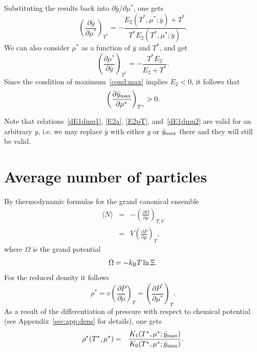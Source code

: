 \documentclass[12pt]{article}
\numberwithin{equation}{section}
\begin{document}
	Substituting the results back into $\partial \bar{y}/\partial \mu^*$, one gets
	\begin{equation}
		\left(\frac{\partial \bar{y}}{\partial \mu^*} \right)_{T^*} = -\frac{E_2(T^*,\mu^*;\bar{y}) + T^*}{T^* E_2(T^*,\mu^*;\bar{y})}.
	\end{equation}
	We can also consider $\mu^*$ as a function of $\bar{y}$ and $T^*$, and get
	\begin{equation}
		\left(\frac{\partial \mu^*}{\partial \bar{y}} \right)_{T^*} = -\frac{T^* E_2}{E_2 + T^*}.
	\end{equation}
	Since the condition of maximum~\eqref{cond:max} implies $E_2 < 0$, it follows that
	\begin{equation}
		\left(\frac{\partial \bar{y}_{\rm max}}{\partial \mu^*} \right)_{T^*} > 0.
	\end{equation}
	
	Note that relations~\eqref{dE1dmu1}, \eqref{E2a}, \eqref{E2pT}, and~\eqref{dE1dmu2} are valid for an arbitrary $y$, i.e. we may replace $\bar{y}$ with either $y$ or $\bar{y}_{\rm max}$ there and they will still be valid.
	
	
	\pagebreak
	\section{Average number of particles}
	By thermodynamic formulas for the grand canonical ensemble
	\begin{eqnarray}
		\langle N \rangle & = & -\left(\frac{\partial \Omega}{\partial \mu}\right)_{T,V}
		\nonumber\\
		& = & V \left(\frac{\partial P}{\partial \mu}\right)_T,
	\end{eqnarray}
	where $\Omega$ is the grand potential
	\begin{equation}
		\Omega = -k_{\rm B} T \ln \Xi.
	\end{equation}
	For the reduced density it follows
	\begin{equation}
		\label{eq:dens}
		\rho^* = v\left(\frac{\partial P}{\partial \mu}\right)_T = \left(\frac{\partial P^*}{\partial \mu^*}\right)_T.
	\end{equation}
	As a result of the differentiation of pressure with respect to chemical potential (see Appendix~\ref{sec:app:dens} for details), one gets
	\begin{eqnarray}
		\label{eq:densK}
		\rho^*(T^*,\mu^*) & = & \frac{K_1(T^*,\mu^*;\bar{y}_{\rm max})}{K_0(T^*,\mu^*;\bar{y}_{\rm max})}.
	\end{eqnarray}
	
\end{document}
